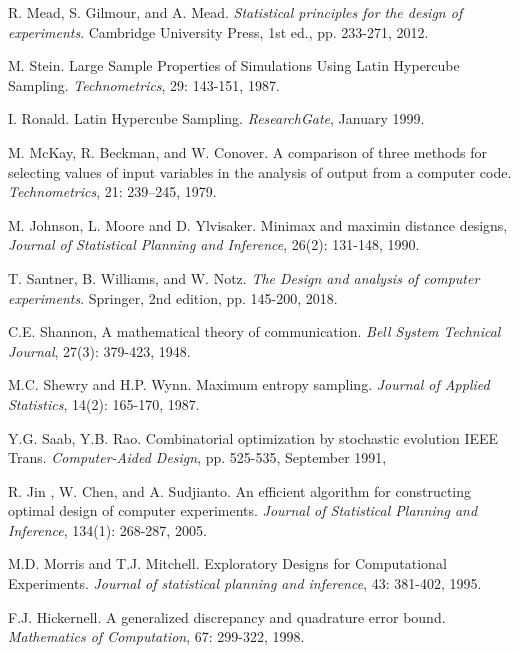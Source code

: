 R. Mead, S. Gilmour, and  A. Mead. \textit{Statistical 
principles for the design of experiments}. Cambridge 
University Press, 1st ed., pp. 233-271, 2012.

M. Stein. Large Sample Properties of Simulations Using Latin 
Hypercube Sampling. \textit{Technometrics}, 29: 143-151, 
1987. 

I. Ronald. Latin Hypercube Sampling. \textit{ResearchGate}, 
January 1999.

M. McKay, R. Beckman, and W. Conover. A comparison of three methods 
for selecting values of input variables in the analysis of output 
from a computer code. \textit{Technometrics}, 21: 239–245, 1979.

M. Johnson, L. Moore and D. Ylvisaker. Minimax and maximin 
distance designs, \textit{Journal of Statistical Planning and 
Inference}, 26(2): 131-148, 1990.

T. Santner, B. Williams, and W. Notz. \textit{The Design and 
analysis of computer experiments}. Springer, 2nd edition, 
pp. 145-200, 2018.
 
C.E. Shannon, A mathematical theory of communication. 
\textit{Bell System Technical Journal}, 27(3): 379-423, 1948.

M.C. Shewry and H.P. Wynn. Maximum entropy sampling. 
\textit{Journal of Applied Statistics}, 14(2): 165-170, 1987.


Y.G. Saab, Y.B. Rao. Combinatorial optimization by 
stochastic evolution IEEE Trans. \textit{Computer-Aided 
Design}, pp. 525-535, September 1991,

R. Jin , W. Chen, and A. Sudjianto. An efficient 
algorithm for constructing optimal design of computer 
experiments. \textit{Journal of Statistical Planning and 
Inference}, 134(1): 268-287, 2005.

M.D. Morris and  T.J. Mitchell. Exploratory Designs for 
Computational Experiments. \textit{Journal of statistical 
planning and inference}, 43: 381-402, 1995. 

F.J. Hickernell. A  generalized  discrepancy  and  quadrature  
error  bound. \textit{Mathematics of Computation}, 67: 299-322, 
1998.  

